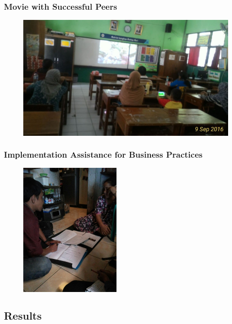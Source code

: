 \documentclass[hideothersubsections, usenames,dvipsnames,11pt]{beamer}
\begin{document}
\begin{frame}
\frametitle{Movie with Successful Peers}
\begin{figure}[htbp]
	\centering
		\includegraphics[width=4.4in]{pics/movie.jpg}
   
	\label{height}
\end{figure}
\end{frame}


\begin{frame}
\frametitle{Implementation Assistance for Business Practices}
\begin{figure}[htbp]
	\centering
		\includegraphics[width=2.0in]{pics/Assistance_expl.jpg}
	
	\label{height}
\end{figure}
\end{frame}


\subsection{Results}
\end{document}
